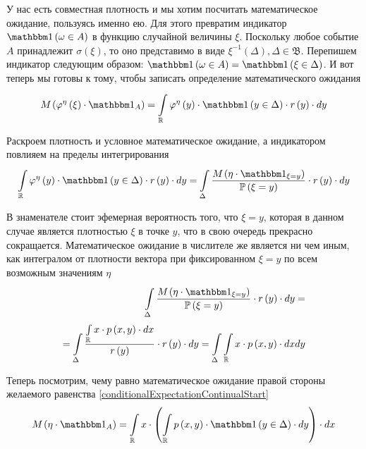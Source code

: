 У нас есть совместная плотность и мы хотим посчитать математическое ожидание,
пользуясь именно ею.
Для этого превратим индикатор $\indicator{\omega \in A}$
в функцию случайной величины $\xi$.
Поскольку любое событие $A$ принадлежит $\sigma\left( \xi \right)$,
то оно представимо в виде
$\xi^{-1}\left( \Delta \right), \Delta \in \mathfrak{B}$.
Перепишем индикатор следующим образом:
$\indicator{\omega \in A} = \indicator{\xi \in \Delta}$.
И вот теперь мы готовы к тому,
чтобы записать определение математического ожидания
$$\mean{\left( \varphi^{\eta}\left( \xi \right) \cdot \indicatorof{A} \right)}
    = \integral{\mathbb{R}}{}{y}{
        \varphi^{\eta}\left( y \right) \cdot \indicator{y \in \Delta}
            \cdot r\left( y \right) \cdot}$$

Раскроем плотность и условное математическое ожидание,
а индикатором повлияем на пределы интегрирования
$$\integral{\mathbb{R}}{}{y}{
    \varphi^{\eta}\left( y \right) \cdot \indicator{y \in \Delta}
            \cdot r\left( y \right) \cdot}
    = \integral{\Delta}{}{y}{
        \frac{\mean{\left( \eta \cdot \indicatorof{\xi=y} \right)}}
            {\probability{\xi = y}}
        \cdot r\left( y \right) \cdot}$$

В знаменателе стоит эфемерная вероятность того, что $\xi = y$,
которая в данном случае является плотностью $\xi$ в точке $y$,
что в свою очередь прекрасно сокращается.
Математическое ожидание в числителе же является ни чем иным,
как интегралом от плотности вектора при фиксированном $\xi=y$
по всем возможным значениям $\eta$
\begin{align*}
    \integral{\Delta}{}{y}{
        \frac{\mean{\left( \eta \cdot \indicatorof{\xi=y} \right)}}
            {\probability{\xi = y}}
        \cdot r\left( y \right) \cdot} = \\
        = \integral{\Delta}{}{y}{
            \frac{\integral{\mathbb{R}}{}{x}{x \cdot \pdf{x,y} \cdot}}
                {r\left( y \right)} \cdot r\left( y \right) \cdot}
        = \integral{\Delta}{}{y}{\integral{\mathbb{R}}{}{x}{
            x \cdot \pdf{x,y} \cdot}}
\end{align*}

Теперь посмотрим, чему равно математическое ожидание правой стороны
желаемого равенства \eqref{conditionalExpectationContinualStart}
$$\mean{\left( \eta \cdot \indicatorof{A} \right)}
    = \integral{\mathbb{R}}{}{x}{
        x \cdot \left(
            \integral{\mathbb{R}}{}{y}{
                \pdf{x,y} \cdot \indicator{y \in \Delta} \cdot} \right)
            \cdot}$$

